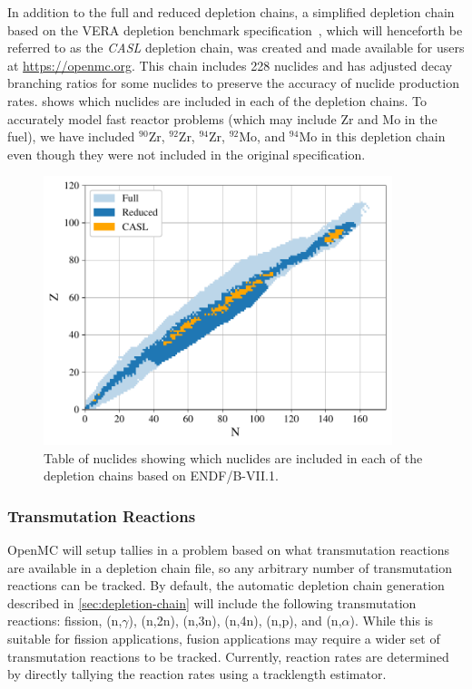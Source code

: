 \documentclass[3p,authoryear]{elsarticle}
\begin{document}
In addition to the full and reduced depletion chains, a simplified depletion
chain based on the VERA depletion benchmark specification~\citep{kim2015casl},
which will henceforth be referred to as the \emph{CASL} depletion chain, was
created and made available for users at \url{https://openmc.org}. This chain
includes 228 nuclides and has adjusted decay branching ratios for some nuclides
to preserve the accuracy of nuclide production rates.  shows
which nuclides are included in each of the depletion chains. To accurately model
fast reactor problems (which may include Zr and Mo in the fuel), we have
included $^{90}$Zr, $^{92}$Zr, $^{94}$Zr, $^{92}$Mo, and $^{94}$Mo in this
depletion chain even though they were not included in the original
specification.
\begin{figure}
  \centering
  \includegraphics[width=4in]{figures/chains.pdf}
  \caption{Table of nuclides showing which nuclides are included in each of the
    depletion chains based on ENDF/B-VII.1.}
  \label{fig:chains}
\end{figure}

\subsubsection{Transmutation Reactions}

OpenMC will setup tallies in a problem based on what transmutation reactions are
available in a depletion chain file, so any arbitrary number of transmutation
reactions can be tracked. By default, the automatic depletion chain generation
described in \cref{sec:depletion-chain} will include the following transmutation
reactions: fission, (n,$\gamma$), (n,2n), (n,3n), (n,4n), (n,p), and
(n,$\alpha$). While this is suitable for fission applications, fusion
applications may require a wider set of transmutation reactions to be tracked.
Currently, reaction rates are determined by directly tallying the reaction rates
using a tracklength estimator.
\end{document}
